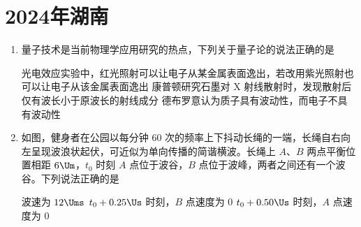 \documentclass[\gkver]{gaokaozhenti}
\begin{document}
\chapter{2024年湖南}

\begin{enumerate}
\item
量子技术是当前物理学应用研究的热点，下列关于量子论的说法正确的是

{光电效应实验中，红光照射可以让电子从某金属表面逸出，若改用紫光照射也可以让电子从该金属表面逸出}
{康普顿研究石墨对 X 射线散射时，发现散射后仅有波长小于原波长的射线成分}
{德布罗意认为质子具有波动性，而电子不具有波动性}


\item
如图，健身者在公园以每分钟 60 次的频率上下抖动长绳的一端，长绳自右向左呈现波浪状起伏，可近似为单向传播的简谐横波。长绳上 $A$、$B$ 两点平衡位置相距 $6 \Um$，$t_{0}$ 时刻 $A$ 点位于波谷，$B$ 点位于波峰，两者之间还有一个波谷。下列说法正确的是


{波速为 $12 \Ums$}
{$t_{0} + 0.25 \Us$ 时刻，$B$ 点速度为 0}
{$t_{0} + 0.50 \Us$ 时刻，$A$ 点速度为 0}

\end{enumerate}
\end{document}
